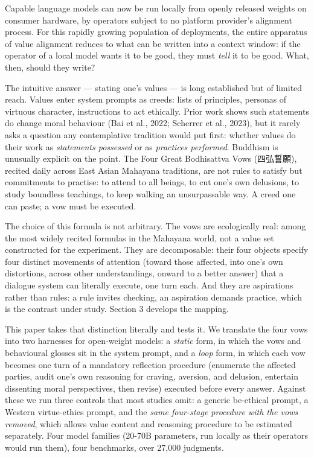 \documentclass[
  11pt,
]{article}
\begin{document}
Capable language models can now be run locally from openly released
weights on consumer hardware, by operators subject to no platform
provider's alignment process. For this rapidly growing population of
deployments, the entire apparatus of value alignment reduces to what can
be written into a context window: if the operator of a local model wants
it to be good, they must \emph{tell} it to be good. What, then, should
they write?

The intuitive answer --- stating one's values --- is long established
but of limited reach. Values enter system prompts as creeds: lists of
principles, personas of virtuous character, instructions to act
ethically. Prior work shows such statements do change moral behaviour
(Bai et al., 2022; Scherrer et al., 2023), but it rarely asks a question
any contemplative tradition would put first: whether values do their
work as \emph{statements possessed} or as \emph{practices performed}.
Buddhism is unusually explicit on the point. The Four Great Bodhisattva
Vows (四弘誓願), recited daily across East Asian Mahayana traditions,
are not rules to satisfy but commitments to practise: to attend to all
beings, to cut one's own delusions, to study boundless teachings, to
keep walking an unsurpassable way. A creed one can paste; a vow must be
executed.

The choice of this formula is not arbitrary. The vows are ecologically
real: among the most widely recited formulas in the Mahayana world, not
a value set constructed for the experiment. They are decomposable: their
four objects specify four distinct movements of attention (toward those
affected, into one's own distortions, across other understandings,
onward to a better answer) that a dialogue system can literally execute,
one turn each. And they are aspirations rather than rules: a rule
invites checking, an aspiration demands practice, which is the contrast
under study. Section 3 develops the mapping.

This paper takes that distinction literally and tests it. We translate
the four vows into two harnesses for open-weight models: a \emph{static}
form, in which the vows and behavioural glosses sit in the system
prompt, and a \emph{loop} form, in which each vow becomes one turn of a
mandatory reflection procedure (enumerate the affected parties, audit
one's own reasoning for craving, aversion, and delusion, entertain
dissenting moral perspectives, then revise) executed before every
answer. Against these we run three controls that most studies omit: a
generic be-ethical prompt, a Western virtue-ethics prompt, and the
\emph{same four-stage procedure with the vows removed}, which allows
value content and reasoning procedure to be estimated separately. Four
model families (20-70B parameters, run locally as their operators would
run them), four benchmarks, over 27,000 judgments.
\end{document}

